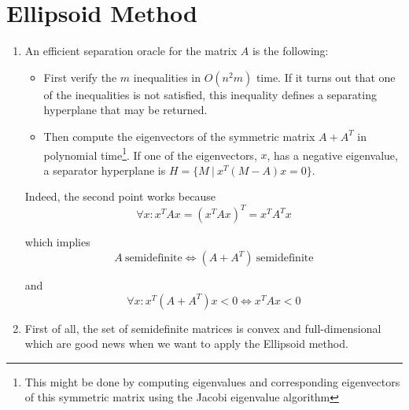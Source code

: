 \documentclass{scrartcl}
\begin{document}
\section{Ellipsoid Method}
\begin{enumerate}
\item
An efficient separation oracle for the matrix $A$ is the following:
\begin{itemize}
\item First verify the $m$ inequalities in $O(n^2m)$ time. If it turns out that one of the inequalities is not satisfied, this inequality defines a separating hyperplane that may be returned.

\item Then compute the eigenvectors of the symmetric matrix $A + A^T$ in polynomial time\footnote{This might be done by computing eigenvalues and corresponding eigenvectors of this symmetric matrix using the Jacobi eigenvalue algorithm}. If one of the eigenvectors, $x$, has a negative eigenvalue, a separator hyperplane is $H = \{M\ |\ x^T (M-A) x = 0\}$.
\end{itemize}

Indeed, the second point works because
\[
\forall x\colon  x^T A x = (x^T A x)^T = x^T A^T x
\]

which implies
\[
A \ \text{semidefinite} \iff (A + A^T)\ \text{semidefinite}
\]

and
\[
\forall x\colon x^T (A + A^T) x < 0 \iff x^T A x < 0
\]

\item
First of all, the set of semidefinite matrices is convex and full-dimensional which are good news when we want to apply the Ellipsoid method.


\end{enumerate}
\end{document}
